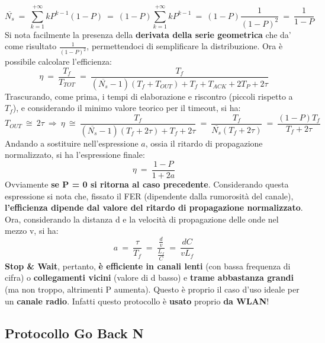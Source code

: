 \documentclass[12pt]{article}
\begin{document}
\begin{equation*}
    \overline{N_s}\ =\ \sum^{+\infty}_{k=1}kP^{k-1}(1-P)\ =\ (1-P)\sum^{+\infty}_{k=1}kP^{k-1} \ =\ (1-P)\frac{1}{(1-P)^2}\ =\ \frac{1}{1-P}
\end{equation*}
Si nota facilmente la presenza della \textbf{derivata della serie geometrica} che da' come risultato $\frac{1}{(1-P)^2}$, permettendoci di semplificare la distribuzione. Ora è possibile calcolare l'efficienza:
\begin{equation*}
    \eta\ =\ \frac{T_f}{T_{TOT}}\ =\ \frac{T_f}{(\overline{N_s}-1)(T_f + T_{OUT}) + T_f + T_{ACK} + 2T_P + 2\tau}
\end{equation*}
Trascurando, come prima, i tempi di elaborazione e riscontro (piccoli rispetto a $T_f$), e considerando il minimo valore teorico per il timeout, si ha:
\begin{equation*}
    T_{OUT}\ \cong\ 2\tau\ \Rightarrow\ \eta\ \cong\ \frac{T_f}{(\overline{N_s}-1)(T_f + 2\tau) + T_f + 2\tau}\ =\ \frac{T_f}{\overline{N_s}(T_f + 2\tau)}\ =\ \frac{(1 - P)T_f}{T_f + 2\tau}
\end{equation*}
Andando a sostituire nell'espressione $a$, ossia il ritardo di propagazione normalizzato, si ha l'espressione finale:
\begin{equation*}
    \eta\ =\ \frac{1 - P}{1 + 2a}
\end{equation*}
Ovviamente \textbf{se P = 0 si ritorna al caso precedente}. Considerando questa espressione si nota che, fissato il FER (dipendente dalla rumorosità del canale), \textbf{l'efficienza dipende dal valore del ritardo di propagazione normalizzato}. Ora, considerando la distanza d e la velocità di propagazione delle onde nel mezzo v, si ha:
\begin{equation*}
    a\ =\ \frac{\tau}{T_f}\ =\ \frac{\frac{d}{v}}{\frac{L_f}{C}}\ =\ \frac{dC}{vL_f}
\end{equation*}
\textbf{Stop \& Wait}, pertanto, \textbf{è efficiente in canali lenti} (con bassa frequenza di cifra) o \textbf{collegamenti vicini} (valore di d basso) e \textbf{trame abbastanza grandi} (ma non troppo, altrimenti P aumenta). Questo è proprio il caso d'uso ideale per un \textbf{canale radio}.
Infatti questo protocollo è \textbf{usato} proprio \textbf{da WLAN}!

\subsection{Protocollo Go Back N}
\end{document}
